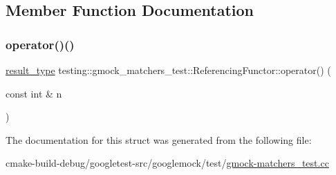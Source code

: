 \subsection{Member Function Documentation}
\mbox{\label{structtesting_1_1gmock__matchers__test_1_1ReferencingFunctor_a149f15ed9afbff28f5c3639c0f3eb255}} 
\subsubsection{\texorpdfstring{operator()()}{operator()()}}
{\footnotesize\ttfamily \mbox{\hyperlink{structtesting_1_1gmock__matchers__test_1_1ReferencingFunctor_a5856a8175e2f797a6733a363b2834094}{result\+\_\+type}} testing\+::gmock\+\_\+matchers\+\_\+test\+::\+Referencing\+Functor\+::operator() (\begin{DoxyParamCaption}\item[{const int \&}]{n }\end{DoxyParamCaption})\hspace{0.3cm}{\ttfamily [inline]}}



The documentation for this struct was generated from the following file\+:\begin{DoxyCompactItemize}
\item 
cmake-\/build-\/debug/googletest-\/src/googlemock/test/\mbox{\hyperlink{gmock-matchers__test_8cc}{gmock-\/matchers\+\_\+test.\+cc}}\end{DoxyCompactItemize}

